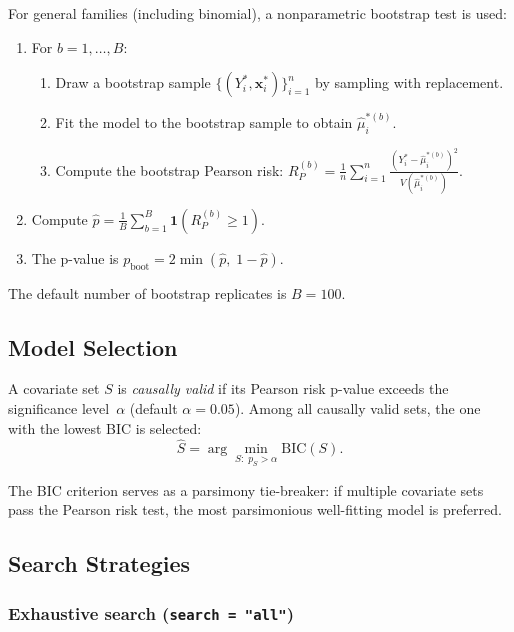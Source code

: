 \documentclass[11pt,a4paper]{article}
\begin{document}
For general families (including binomial), a nonparametric bootstrap test is used:
\begin{enumerate}
    \item For $b = 1, \ldots, B$:
    \begin{enumerate}
        \item Draw a bootstrap sample $\{(Y_i^{*}, \mathbf{x}_i^{*})\}_{i=1}^n$ by sampling with replacement.
        \item Fit the model to the bootstrap sample to obtain $\hat{\mu}_i^{*(b)}$.
        \item Compute the bootstrap Pearson risk: $R_P^{(b)} = \frac{1}{n}\sum_{i=1}^n \frac{(Y_i^{*} - \hat{\mu}_i^{*(b)})^2}{V(\hat{\mu}_i^{*(b)})}$.
    \end{enumerate}
    \item Compute $\hat{p} = \frac{1}{B}\sum_{b=1}^B \mathbf{1}(R_P^{(b)} \geq 1)$.
    \item The p-value is $p_{\text{boot}} = 2 \min(\hat{p},\; 1 - \hat{p})$.
\end{enumerate}

The default number of bootstrap replicates is $B = 100$.

\subsection{Model Selection}

A covariate set $S$ is \emph{causally valid} if its Pearson risk p-value exceeds the significance level~$\alpha$ (default $\alpha = 0.05$). Among all causally valid sets, the one with the lowest BIC is selected:
\begin{equation}
\hat{S} = \arg\min_{S:\; p_S > \alpha} \text{BIC}(S).
\end{equation}

The BIC criterion serves as a parsimony tie-breaker: if multiple covariate sets pass the Pearson risk test, the most parsimonious well-fitting model is preferred.

\subsection{Search Strategies}
\label{sec:search}

\subsubsection{Exhaustive search (\texttt{search = "all"})}
\end{document}
